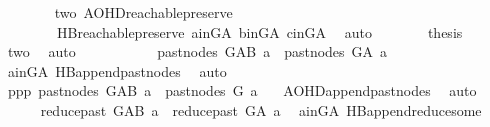 \begin{isabellebody}
\ \ \ \ \ \ \isamarkupfalse%
\ two\ AOHD{\isachardot}{\kern0pt}reachable{}{\isacharunderscore}{\kern0pt}preserve\isanewline
\ \ \ \ \ \ \ \ HB{}{\isachardot}{\kern0pt}reachable{}{\isacharunderscore}{\kern0pt}preserve\ a{\isacharunderscore}{\kern0pt}in{\isacharunderscore}{\kern0pt}G{\isacharunderscore}{\kern0pt}A\ b{\isacharunderscore}{\kern0pt}in{\isacharunderscore}{\kern0pt}G{\isacharunderscore}{\kern0pt}A\ c{\isacharunderscore}{\kern0pt}in{\isacharunderscore}{\kern0pt}G{\isacharunderscore}{\kern0pt}A\ \isamarkupfalse%
\ auto\isanewline
\ \ \ \ \isamarkupfalse%
\ \isamarkupfalse%
\ {\isacharquery}{\kern0pt}thesis\ \isamarkupfalse%
\ two\ \isamarkupfalse%
\ auto\isanewline
\ \ \isamarkupfalse%
\ \isanewline
\ \ \ \ \isamarkupfalse%
\ \ {\isachardoublequoteopen}past{\isacharunderscore}{\kern0pt}nodes\ G{\isacharunderscore}{\kern0pt}AB\ a\ {\isacharequal}{\kern0pt}\ past{\isacharunderscore}{\kern0pt}nodes\ G{\isacharunderscore}{\kern0pt}A\ a{\isachardoublequoteclose}\ \isamarkupfalse%
\ a{\isacharunderscore}{\kern0pt}in{\isacharunderscore}{\kern0pt}G{\isacharunderscore}{\kern0pt}A\ HB{}{\isachardot}{\kern0pt}append{\isacharunderscore}{\kern0pt}past{\isacharunderscore}{\kern0pt}nodes\ \isamarkupfalse%
\ auto\isanewline
\ \ \ \ \isamarkupfalse%
\ \isamarkupfalse%
\ ppp{\isacharcolon}{\kern0pt}\ {\isachardoublequoteopen}past{\isacharunderscore}{\kern0pt}nodes\ G{\isacharunderscore}{\kern0pt}AB\ a\ {\isacharequal}{\kern0pt}\ past{\isacharunderscore}{\kern0pt}nodes\ G\ a{\isachardoublequoteclose}\ \isamarkupfalse%
\ {}{\isacharparenleft}{\kern0pt}{}{\isacharparenright}{\kern0pt}\ AOHD{\isachardot}{\kern0pt}append{\isacharunderscore}{\kern0pt}past{\isacharunderscore}{\kern0pt}nodes\ \isamarkupfalse%
\ auto\isanewline
\ \ \ \ \isamarkupfalse%
\ {\isachardoublequoteopen}reduce{\isacharunderscore}{\kern0pt}past\ G{\isacharunderscore}{\kern0pt}AB\ a\ {\isacharequal}{\kern0pt}\ reduce{\isacharunderscore}{\kern0pt}past\ G{\isacharunderscore}{\kern0pt}A\ a{\isachardoublequoteclose}\ \isamarkupfalse%
\ a{\isacharunderscore}{\kern0pt}in{\isacharunderscore}{\kern0pt}G{\isacharunderscore}{\kern0pt}A\ HB{}{\isachardot}{\kern0pt}append{\isacharunderscore}{\kern0pt}reduce{\isacharunderscore}{\kern0pt}some\ \isamarkupfalse%

\end{isabellebody}
